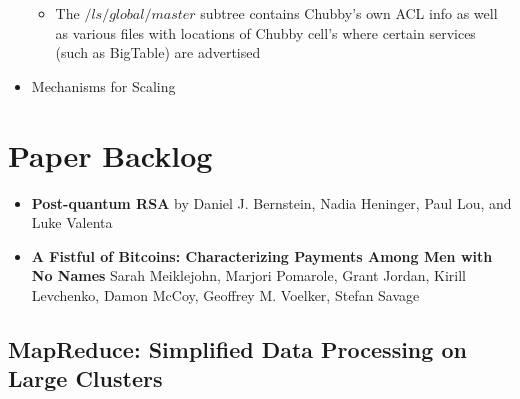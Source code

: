 \documentclass[a4paper]{article}
\begin{document}
\begin{itemize}
\begin{itemize}
\item The $/ls/global/master$ subtree contains Chubby's own ACL info as well as various files with locations of Chubby cell's where certain services (such as BigTable) are advertised  
\end{itemize}

\item Mechanisms for Scaling


\end{itemize}


\section {Paper Backlog}

\begin{itemize}
\item \textbf{Post-quantum RSA} by Daniel J. Bernstein, Nadia Heninger, Paul Lou, and Luke Valenta

\item \textbf{A Fistful of Bitcoins: Characterizing Payments Among Men with No Names} Sarah Meiklejohn, Marjori Pomarole, Grant Jordan, Kirill Levchenko, Damon McCoy, Geoffrey M. Voelker, Stefan Savage
\end{itemize}

\subsection{MapReduce: Simplified Data Processing on Large Clusters}
\end{document}
